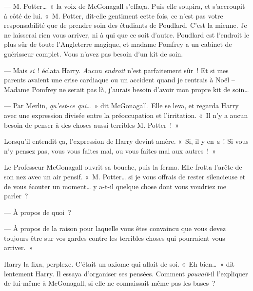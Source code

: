 --- M. Potter…~» la voix de McGonagall s'effaça. Puis elle soupira, et s'accroupit à côté de lui. «~M. Potter, dit-elle gentiment cette fois, ce n'est pas votre responsabilité que de prendre soin des étudiants de Poudlard. C'est la mienne. Je ne laisserai rien vous arriver, ni à qui que ce soit d'autre. Poudlard est l'endroit le plus sûr de toute l'Angleterre magique, et madame Pomfrey a un cabinet de guérisseur complet. Vous n'avez pas besoin d'un kit de soin.

--- Mais \emph{si}~! éclata Harry. \emph{Aucun endroit} n'est parfaitement sûr~! Et si mes parents avaient une crise cardiaque ou un accident quand je rentrais à Noël -- Madame Pomfrey ne serait pas là, j'aurais besoin d'avoir mon propre kit de soin…

--- Par Merlin, \emph{qu'est-ce qui}…~» dit McGonagall. Elle se leva, et regarda Harry avec une expression divisée entre la préoccupation et l'irritation. «~Il n'y a aucun besoin de penser à des choses aussi terribles M. Potter~!~»

Lorsqu'il entendit ça, l'expression de Harry devint amère. «~Si, il y en \emph{a}~! Si vous n'y pensez pas, vous vous faites mal, ou vous faites mal aux autres~!~»

Le Professeur McGonagall ouvrit sa bouche, puis la ferma. Elle frotta l'arête de son nez avec un air pensif.
«~M. Potter… si je vous offrais de rester silencieuse et de vous écouter un moment… y a-t-il quelque chose dont vous voudriez me parler~?

--- À propos de quoi~?

--- À propos de la raison pour laquelle vous êtes convaincu que vous devez toujours être sur vos gardes contre les terribles choses qui pourraient vous arriver.~»

Harry la fixa, perplexe. C'était un axiome qui allait de soi. «~Eh bien…~» dit lentement Harry. Il essaya d'organiser ses pensées. Comment \emph{pouvait}-il l'expliquer de lui-même à McGonagall, si elle ne connaissait même pas les bases~?

